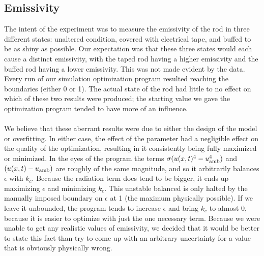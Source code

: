 \documentclass[letterpaper,titlepage,oneside]{report}
\begin{document}
\subsection*{Emissivity}
The intent of the experiment was to measure the emissivity of the
rod in three different states: unaltered condition,
covered with electrical tape, and buffed to be as shiny as possible.
Our expectation was that these three states would each cause
a distinct emissivity, with the taped rod having a higher
emissivity and the buffed rod having a lower emissivity.
This was not made evident by the data. Every run of our
simulation optimization program resulted reaching the boundaries
(either 0 or 1). The actual state of the rod had little to no
effect on which of these two results were produced;
the starting value we gave the optimization program tended to have
more of an influence.
\\\\
We believe that these aberrant results were due to either the design
of the model or overfitting. In either case, the effect of the
parameter had a negligible effect on the quality of the optimization,
resulting in it consistently being fully maximized or minimized.
In the eyes of the program the terms $\sigma(u(x,t)^4-u_{\rm{amb}}^4)$
and $(u(x,t)-u_{\rm{amb}})$ are roughly of the same magnitude,
and so it arbitrarily balances $\epsilon$ with $k_c$. Because the
radiation term does tend to be bigger, it ends up 
maximizing $\epsilon$ and minimizing $k_c$. This unstable balanced is only
halted by the manually imposed boundary on $\epsilon$ at 1
(the maximum physically possible). If we leave it unbounded,
the program tends to increase $\epsilon$ and bring $k_c$ to almost 0,
because it is easier to optimize with just the one necessary term.
Because we were unable to get any realistic values of emissivity,
we decided that it would be better to state this fact than try to
come up with an arbitrary uncertainty for a value that is
obviously physically wrong.
\end{document}
